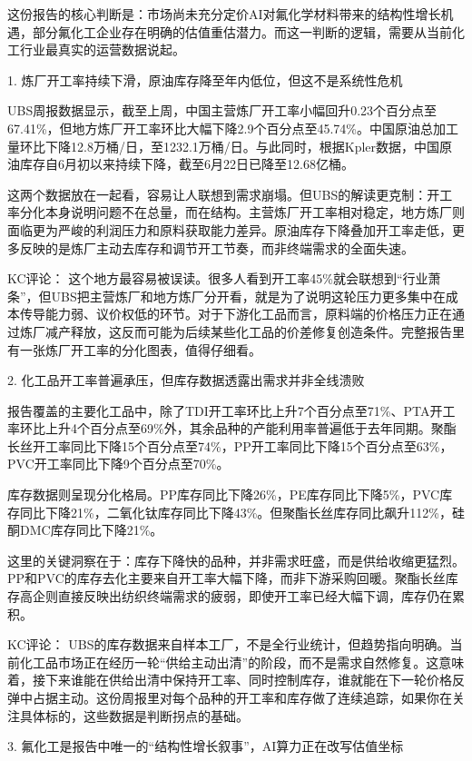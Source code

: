 \documentclass[11pt]{ctexart}
\begin{document}
这份报告的核心判断是：市场尚未充分定价AI对氟化学材料带来的结构性增长机遇，部分氟化工企业存在明确的估值重估潜力。而这一判断的逻辑，需要从当前化工行业最真实的运营数据说起。

1. 炼厂开工率持续下滑，原油库存降至年内低位，但这不是系统性危机

UBS周报数据显示，截至上周，中国主营炼厂开工率小幅回升0.23个百分点至67.41\%，但地方炼厂开工率环比大幅下降2.9个百分点至45.74\%。中国原油总加工量环比下降12.8万桶/日，至1232.1万桶/日。与此同时，根据Kpler数据，中国原油库存自6月初以来持续下降，截至6月22日已降至12.68亿桶。

这两个数据放在一起看，容易让人联想到需求崩塌。但UBS的解读更克制：开工率分化本身说明问题不在总量，而在结构。主营炼厂开工率相对稳定，地方炼厂则面临更为严峻的利润压力和原料获取能力差异。原油库存下降叠加开工率走低，更多反映的是炼厂主动去库存和调节开工节奏，而非终端需求的全面失速。

KC评论： 这个地方最容易被误读。很多人看到开工率45\%就会联想到“行业萧条”，但UBS把主营炼厂和地方炼厂分开看，就是为了说明这轮压力更多集中在成本传导能力弱、议价权低的环节。对于下游化工品而言，原料端的价格压力正在通过炼厂减产释放，这反而可能为后续某些化工品的价差修复创造条件。完整报告里有一张炼厂开工率的分化图表，值得仔细看。

2. 化工品开工率普遍承压，但库存数据透露出需求并非全线溃败

报告覆盖的主要化工品中，除了TDI开工率环比上升7个百分点至71\%、PTA开工率环比上升4个百分点至69\%外，其余品种的产能利用率普遍低于去年同期。聚酯长丝开工率同比下降15个百分点至74\%，PP开工率同比下降15个百分点至63\%，PVC开工率同比下降9个百分点至70\%。

库存数据则呈现分化格局。PP库存同比下降26\%，PE库存同比下降5\%，PVC库存同比下降21\%，二氧化钛库存同比下降43\%。但聚酯长丝库存同比飙升112\%，硅酮DMC库存同比下降21\%。

这里的关键洞察在于：库存下降快的品种，并非需求旺盛，而是供给收缩更猛烈。PP和PVC的库存去化主要来自开工率大幅下降，而非下游采购回暖。聚酯长丝库存高企则直接反映出纺织终端需求的疲弱，即使开工率已经大幅下调，库存仍在累积。

KC评论： UBS的库存数据来自样本工厂，不是全行业统计，但趋势指向明确。当前化工品市场正在经历一轮“供给主动出清”的阶段，而不是需求自然修复。这意味着，接下来谁能在供给出清中保持开工率、同时控制库存，谁就能在下一轮价格反弹中占据主动。这份周报里对每个品种的开工率和库存做了连续追踪，如果你在关注具体标的，这些数据是判断拐点的基础。

3. 氟化工是报告中唯一的“结构性增长叙事”，AI算力正在改写估值坐标
\end{document}

